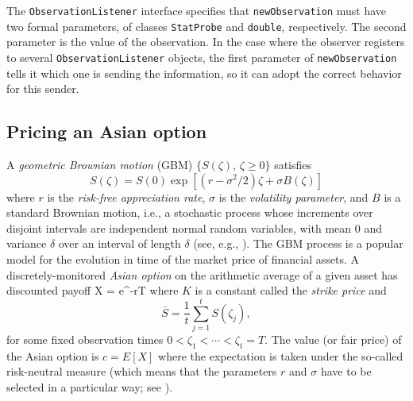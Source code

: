 The \texttt{ObservationListener} interface specifies that \texttt{newObservation}
 must have two formal parameters, of classes \texttt{StatProbe} and
\texttt{double}, respectively. The second parameter is the value of the
observation.
In the case where the observer registers to several \texttt{ObservationListener}
objects, the first parameter of \texttt{newObservation} tells it which one
is sending the information, so it can adopt the correct behavior for
this sender.






\subsection {Pricing an Asian option}
\label {sec:asian}

A \emph{geometric Brownian motion} (GBM) $\{S(\zeta),\,\zeta\ge 0\}$ satisfies
\[
  S(\zeta) = S(0) \exp\left[(r - \sigma^2/2)\zeta + \sigma B(\zeta)\right]
\]
where $r$ is the \emph{risk-free appreciation rate},
$\sigma$ is the \emph{volatility parameter}, and
$B$ is a standard Brownian motion, i.e.,
a stochastic process whose increments over disjoint intervals
are independent normal random variables, with mean 0 and variance
$\delta$ over an interval of length $\delta$ (see, e.g., \cite{fGLA04a}).
The GBM process is a popular model for the evolution in time of the
market price of financial assets.
A discretely-monitored  \emph{Asian option} on the arithmetic
average of a given asset has discounted payoff
\eq                                            \label{eq:payasian}
 X = e^{-rT} \max[\bar S - K,\, 0]
\endeq
where $K$ is a constant called the \emph{strike price} and
\begin{equation}                        \label{eq:arithmetic-average}
 \bar S = \frac{1}{t} \sum_{j=1}^t S(\zeta_j),
\end{equation}
for some fixed observation times $0 < \zeta_1 < \cdots < \zeta_t = T$.
The value (or fair price) of the Asian option is $c = E[X]$ where
the expectation is taken under the so-called risk-neutral measure
(which means that the parameters $r$ and $\sigma$ have to be selected
in a particular way; see \cite{fGLA04a}).

